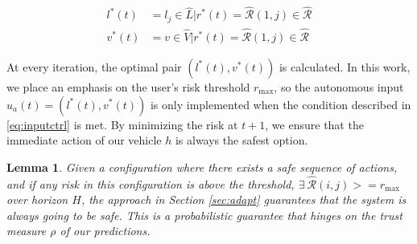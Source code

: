 \documentclass[letterpaper, 10 pt, conference]{ieeeconf}  %
\newcommand\NB[1]{$\spadesuit$\footnote{NB: #1}}
\newtheorem{lemma}{Lemma}
\begin{document}
\begin{align} \label{eq:optpair}
    l^*(t) &=  l_j\in\hat{L}\vert r^*(t) = \hat{\mathcal{R}}(1,j)\in\hat{\mathcal{R}} \nonumber \\
    v^*(t) &=  v\in\hat{V}\vert r^*(t) = \hat{\mathcal{R}}(1,j)\in\hat{\mathcal{R}}
\end{align}


At every iteration, the optimal pair $(l^*(t),v^*(t))$ is calculated. In this work, we place an emphasis on the user's risk threshold $r_{\max}$, so the autonomous input $u_a(t) = (l^*(t),v^*(t))$ is only implemented when the condition described in \eqref{eq:inputctrl} is met. By minimizing the risk at $t+1$, we ensure that the immediate action of our vehicle $h$ is always the safest option.

\begin{lemma}
Given a configuration where there exists a safe sequence of actions, and if any risk in this configuration is above the threshold, $ \exists~\hat{\mathcal{R}}(i,j) >= r_{\max}$ over horizon $H$, the approach in Section \ref{sec:adapt} guarantees that the system is always going to be safe. This is a probabilistic guarantee that hinges on the trust measure $\rho$ of our predictions.
\end{lemma}
\end{document}
